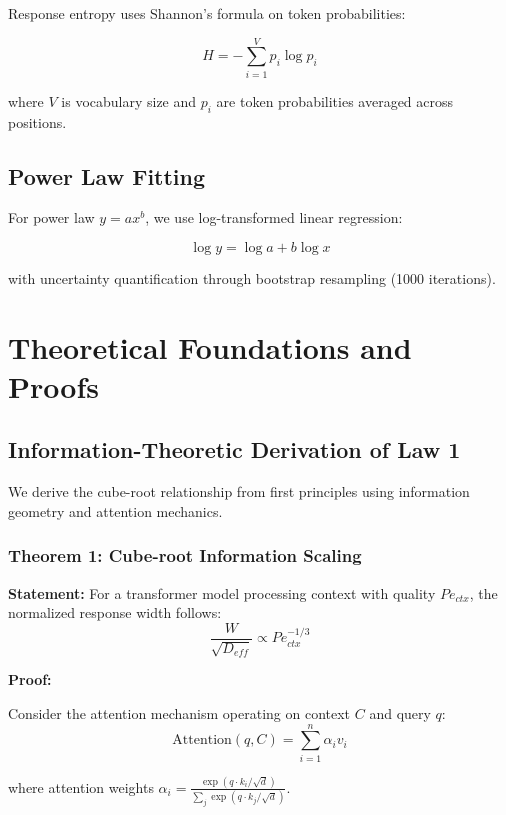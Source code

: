 \documentclass[conference]{IEEEtran}
\begin{document}
Response entropy uses Shannon's formula on token probabilities:

\begin{equation}
H = -\sum_{i=1}^{V} p_i \log p_i
\end{equation}

where $V$ is vocabulary size and $p_i$ are token probabilities averaged across positions.

\subsection{Power Law Fitting}

For power law $y = ax^b$, we use log-transformed linear regression:

\begin{equation}
\log y = \log a + b \log x
\end{equation}

with uncertainty quantification through bootstrap resampling (1000 iterations).

\section{Theoretical Foundations and Proofs}

\subsection{Information-Theoretic Derivation of Law 1}

We derive the cube-root relationship from first principles using information geometry and attention mechanics.

\subsubsection{Theorem 1: Cube-root Information Scaling}

\textbf{Statement:} For a transformer model processing context with quality $Pe_{ctx}$, the normalized response width follows:
$$\frac{W}{\sqrt{D_{eff}}} \propto Pe_{ctx}^{-1/3}$$

\textbf{Proof:}

Consider the attention mechanism operating on context $C$ and query $q$:
\begin{equation}
\text{Attention}(q, C) = \sum_{i=1}^n \alpha_i v_i
\end{equation}

where attention weights $\alpha_i = \frac{\exp(q \cdot k_i / \sqrt{d})}{\sum_j \exp(q \cdot k_j / \sqrt{d})}$.
\end{document}

